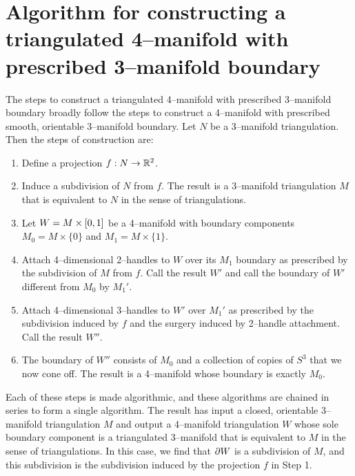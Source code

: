 \chapter[Triangulated]{Algorithm for constructing a triangulated 4--manifold with prescribed 3--manifold boundary}
\label{chapter:triangulation}

The steps to construct a triangulated 4--manifold with prescribed 3--manifold boundary broadly follow the steps to construct a 4--manifold with prescribed smooth, orientable 3--manifold boundary.
Let $N$ be a 3--manifold triangulation.
Then the steps of construction are:
\begin{enumerate}
	\item Define a projection $f:N\to\mathbb{R}^2$.
	
	\item Induce a subdivision of $N$ from $f$.  The result is a 3--manifold triangulation $M$ that is equivalent to $N$ in the sense of triangulations.

	\item Let $W=M\times[0,1]$ be a 4--manifold with boundary components $M_0 = M\times\{0\}$ and $M_1 = M\times\{1\}$.
	
	\item Attach 4--dimensional 2--handles to $W$ over its $M_1$ boundary as prescribed by the subdivision of $M$ from $f$.  Call the result $W'$ and call the boundary of $W'$ different from $M_0$ by $M_1'$.
	
	\item Attach 4--dimensional 3--handles to $W'$ over $M_1'$ as prescribed by the subdivision induced by $f$ and the surgery induced by 2--handle attachment.  Call the result $W''$.
	
	\item The boundary of $W''$ consists of $M_0$ and a collection of copies of $S^3$ that we now cone off.  The result is a 4--manifold whose boundary is exactly $M_0$.
\end{enumerate}

Each of these steps is made algorithmic, and these algorithms are chained in series to form a single algorithm.
The result has input a closed, orientable 3--manifold triangulation $M$ and output a 4--manifold triangulation $W$ whose sole boundary component is a triangulated 3--manifold that is equivalent to $M$ in the sense of triangulations.
In this case, we find that $\partial W$ is a subdivision of $M$, and this subdivision is the subdivision induced by the projection $f$ in Step 1.

